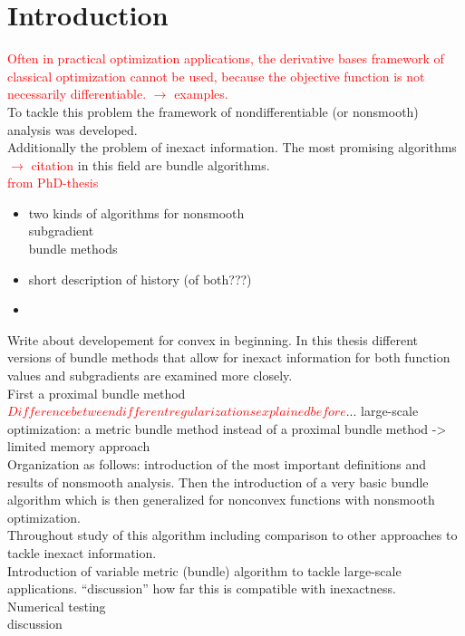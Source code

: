 \section{Introduction}

\textcolor{red}{Often in practical optimization applications, the derivative bases framework of classical optimization cannot be used, because the objective function is not necessarily differentiable. \(\rightarrow\) examples.} \\
To tackle this problem the framework of nondifferentiable (or nonsmooth) analysis was developed. \\
Additionally the problem of inexact information. 
The most promising algorithms \textcolor{red}{\(\rightarrow\) citation}  in this field are bundle algorithms. \\
\textcolor{red}{from PhD-thesis}
\begin{itemize}
	\item two kinds of algorithms for nonsmooth \\
	subgradient \\
	bundle methods \\
	\item short description of history (of both???)
	\item 
\end{itemize}

Write about developement for convex in beginning.
In this thesis different versions of bundle methods that allow for inexact information for both function values and subgradients are examined more closely. \\
First a proximal bundle method \textcolor{red}{\(Difference between different regularizations explained before\)}...
large-scale optimization: a metric bundle method instead of a proximal bundle method -> limited memory approach \\
Organization as follows: introduction of the most important definitions and results of nonsmooth analysis. Then the introduction of a very basic bundle algorithm which is then generalized for nonconvex functions with nonsmooth optimization. \\
Throughout study of this algorithm including comparison to other approaches to tackle inexact information. \\
Introduction of variable metric (bundle) algorithm to tackle large-scale applications. ``discussion'' how far this is compatible with inexactness. \\
Numerical testing \\ 
discussion \\
